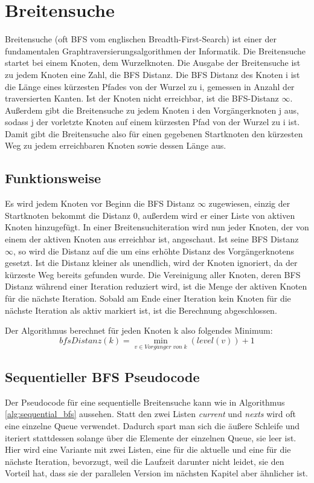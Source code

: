 
\section{Breitensuche} %
\label{sec:breitensuche}

Breitensuche (oft BFS vom englischen Breadth-First-Search) ist einer der fundamentalen Graphtraversierungsalgorithmen der Informatik. Die Breitensuche startet bei einem Knoten, dem Wurzelknoten. Die Ausgabe der Breitensuche ist zu jedem Knoten eine Zahl, die BFS Distanz. Die BFS Distanz des Knoten i ist die Länge eines kürzesten Pfades von der Wurzel zu i, gemessen in Anzahl der traversierten Kanten. Ist der Knoten nicht erreichbar, ist die BFS-Distanz $\infty$. Außerdem gibt die Breitensuche zu jedem Knoten i den Vorgängerknoten j aus, sodass j der vorletzte Knoten auf einem kürzesten Pfad von der Wurzel zu i ist. Damit gibt die Breitensuche also für einen gegebenen Startknoten den kürzesten Weg zu jedem erreichbaren Knoten sowie dessen Länge aus.

\subsection{Funktionsweise} %
\label{sub:funktionsweise}
Es wird jedem Knoten vor Beginn die BFS Distanz $ \infty $ zugewiesen, einzig der Startknoten bekommt die Distanz 0, außerdem wird er einer Liste von aktiven Knoten hinzugefügt. In einer Breitensuchiteration wird nun jeder Knoten, der von einem der aktiven Knoten aus erreichbar ist, angeschaut. Ist seine BFS Distanz $ \infty $, so wird die Distanz auf die um eins erhöhte Distanz des Vorgängerknotens gesetzt. Ist die Distanz kleiner als unendlich, wird der Knoten ignoriert, da der kürzeste Weg bereits gefunden wurde. Die Vereinigung aller Knoten, deren BFS Distanz während einer Iteration reduziert wird, ist die Menge der aktiven Knoten für die nächste Iteration. Sobald am Ende einer Iteration kein Knoten für die nächste Iteration als aktiv markiert ist, ist die Berechnung abgeschlossen. 

Der Algorithmus berechnet für jeden Knoten k also folgendes Minimum\cite{Hassaan:2010:OUA:1854273.1854341}:
$$
bfsDistanz(k) =  \min_{v \in Vorg\ddot{a}nger \; von \; k} (level(v))+1
$$


\subsection{Sequentieller BFS Pseudocode} %
\label{sub:sequentieller_bfs_pseudocode}
Der Pseudocode für eine sequentielle Breitensuche kann wie in Algorithmus \ref{alg:sequential_bfs} aussehen. Statt den zwei Listen \textit{current} und \textit{nexts} wird oft eine einzelne Queue verwendet. Dadurch spart man sich die äußere Schleife und iteriert stattdessen solange über die Elemente der einzelnen Queue, sie leer ist. Hier wird eine Variante mit zwei Listen, eine für die aktuelle und eine für die nächste Iteration, bevorzugt, weil die Laufzeit darunter nicht leidet, sie den Vorteil hat, dass sie der parallelen Version im nächsten Kapitel aber ähnlicher ist.


